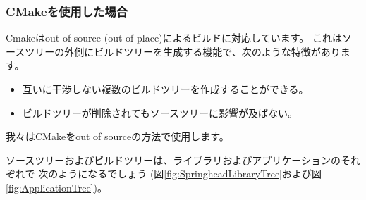 \subsubsection{CMakeを使用した場合}
\label{subsubsec:CmakeMethod}
\parindent=0pt

Cmakeはout of source (out of place)によるビルドに対応しています。
これはソースツリーの外側にビルドツリーを生成する機能で、次のような特徴があります。
\begin{itemize}
  \item	互いに干渉しない複数のビルドツリーを作成することができる。
  \item	ビルドツリーが削除されてもソースツリーに影響が及ばない。
\end{itemize}
我々はCMakeをout of sourceの方法で使用します。

\medskip
ソースツリーおよびビルドツリーは、ライブラリおよびアプリケーションのそれぞれで
次のようになるでしょう
(図\ref{fig:SpringheadLibraryTree}および図\ref{fig:ApplicationTree})。

